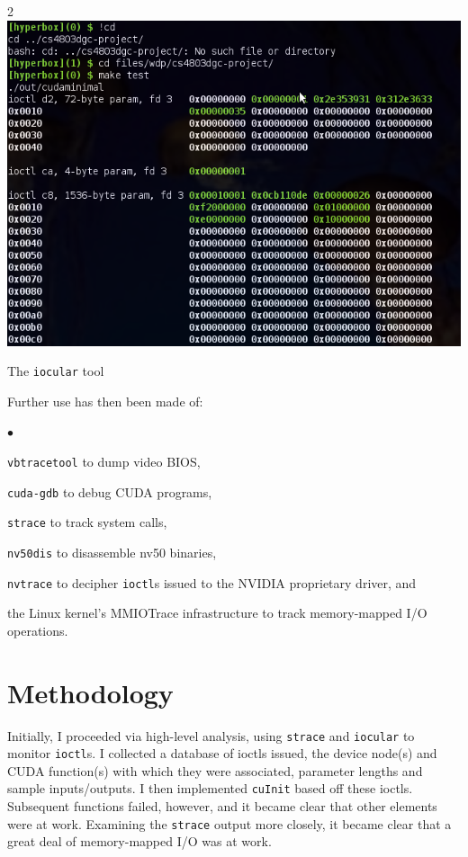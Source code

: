 \documentclass[letterpaper,10pt]{article}
\makeatletter
\newenvironment{figurehere}
{\def\@captype{figure}}
{}
\newcommand{\squishlist}{\begin{list}{$\bullet$}
  {\setlength{\itemsep}{0pt}
    \setlength{\parsep}{3pt}
    \setlength{\topsep}{3pt}
    \setlength{\partopsep}{0pt}
    \setlength{\leftmargin}{1.5em}
    \setlength{\labelwidth}{1em}
    \setlength{\labelsep}{0.5em}
  } }
\newcommand{\squishend}{\end{list}}
\makeatother
\begin{document}
\begin{multicols}{2}
\begin{figurehere}
\centering
\includegraphics[width=\columnwidth]{texobjs/iocular.png}
\caption{The \texttt{iocular} tool}
\end{figurehere}
Further use has then been made of:
\squishlist
\item \texttt{vbtracetool}\cite{vbtrace} to dump video BIOS,
\item \texttt{cuda-gdb}\cite{cudagdb} to debug CUDA programs,
\item \texttt{strace}\cite{stracecode} to track system calls,
\item \texttt{nv50dis}\cite{nv50dis} to disassemble nv50 binaries,
\item \texttt{nvtrace}\cite{nvtrace} to decipher \texttt{ioctl}s issued to the NVIDIA proprietary driver, and
\item the Linux kernel's MMIOTrace\cite{mmiotrace} infrastructure to track memory-mapped I/O operations.
\squishend
\section{Methodology}
Initially, I proceeded via high-level analysis, using \texttt{strace} and
\texttt{iocular} to monitor \texttt{ioctl}s. I collected a database of ioctls
issued, the device node(s) and CUDA function(s) with which they were associated,
parameter lengths and sample inputs/outputs. I then implemented \texttt{cuInit}
based off these ioctls. Subsequent functions failed, however, and it became
clear that other elements were at work. Examining the \texttt{strace} output
more closely, it became clear that a great deal of memory-mapped I/O was at
work.


\end{multicols}
\end{document}
